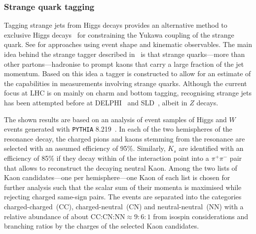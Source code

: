 \documentclass[../report.tex]{subfiles}
\begin{document}
\FloatBarrier

\subsubsection{Strange quark tagging}
\label{sec:strange-tagging}

Tagging strange jets from Higgs decays provides an alternative method to exclusive Higgs decays~\cite{Kagan:2014ila, Perez:2015lra, Koenig:2015pha, Aaboud:2016rug, Aaboud:2017xnb,Alte:2016yuw} for constraining the Yukawa coupling of the strange quark. See  for approaches using event shape and kinematic
observables. The main idea behind the strange tagger described in~ is that
strange quarks---more than other partons---hadronise to prompt kaons that carry a large fraction of the jet momentum. Based on this idea a tagger is constructed to allow for an estimate of the
capabilities in measurements involving strange quarks. Although the current focus at LHC is on
mainly on charm and bottom tagging, recognising strange jets has been attempted before at
DELPHI~\cite{Boudinov:1998fao} and SLD~\cite{Kalelkar:2000ig}, albeit in $Z$ decays.

The shown results are based on an analysis of event samples of Higgs and $W$ events generated with
\texttt{PYTHIA} 8.219~\cite{Sjostrand:2006za, Sjostrand:2014zea}. In each of the two hemispheres of the resonance decay, the charged pions and kaons stemming from the resonance are selected with an
assumed efficiency of 95\%. Similarly, $K_s$ are identified with an efficiency of 85\% if they decay
within  of the interaction point into a $\pi^+\pi^-$ pair that allows to reconstruct
the decaying neutral Kaon. Among the two lists of Kaon candidates---one per hemisphere---one Kaon of
each list is chosen for further analysis such that the scalar sum of their momenta is maximised
while rejecting charged same-sign pairs. The events are separated into the categories
charged-charged~(CC), charged-neutral~(CN) and neutral-neutral~(NN) with a relative abundance of about CC:CN:NN$\approx 9:6:1$ from isospin considerations and branching ratios by the charges of the selected Kaon candidates.
\end{document}
